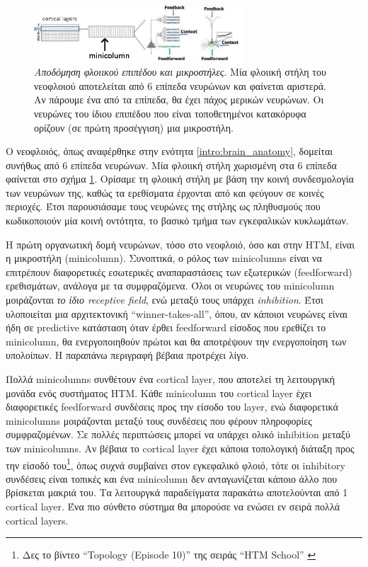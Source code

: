 \begin{figure}
	\centering
	\includegraphics[width=0.7\textwidth]{figures/layer-minicolumn}
	\caption{\textit{Αποδόμηση φλοιικού επιπέδου και μικροστήλες}. Μία φλοιική στήλη του νεοφλοιού αποτελείται από 6 επίπεδα νευρώνων και φαίνεται αριστερά. Αν πάρουμε ένα από τα επίπεδα, θα έχει πάχος μερικών νευρώνων. Οι νευρώνες του ίδιου επιπέδου που είναι τοποθετημένοι κατακόρυφα ορίζουν (σε πρώτη προσέγγιση) μια μικροστήλη.}
	\label{fig:layer-minicolumn}
\end{figure}

Ο νεοφλοιός, όπως αναφέρθηκε στην ενότητα \ref{intro:brain_anatomy}, δομείται συνήθως από 6 επίπεδα νευρώνων.
Μία φλοιική στήλη χωρισμένη στα 6 επίπεδα φαίνεται στο σχήμα \ref{fig:layer-minicolumn}.
Ορίσαμε τη φλοιική στήλη με βάση την κοινή συνδεσμολογία των νευρώνων της, καθώς τα ερεθίσματα έρχονται από και φεύγουν σε κοινές περιοχές.
Έτσι παρουσιάσαμε τους νευρώνες της στήλης ως πληθυσμούς που κωδικοποιούν μία κοινή οντότητα, το βασικό τμήμα των εγκεφαλικών κυκλωμάτων.

Η πρώτη οργανωτική δομή νευρώνων, τόσο στο νεοφλοιό, όσο και στην HTM, είναι η μικροστήλη (minicolumn).
Συνοπτικά, ο ρόλος των minicolumns είναι να επιτρέπουν διαφορετικές εσωτερικές αναπαραστάσεις των εξωτερικών (feedforward) ερεθισμάτων, ανάλογα με τα συμφραζόμενα.
Όλοι οι νευρώνες του minicolumn μοιράζονται \emph{το ίδιο receptive field}, ενώ μεταξύ τους υπάρχει \emph{inhibition}.
Έτσι υλοποιείται μια αρχιτεκτονική ``winner-takes-all'', όπου, αν κάποιοι νευρώνες είναι ήδη σε predictive κατάσταση όταν έρθει feedforward είσοδος που ερεθίζει το minicolumn, θα ενεργοποιηθούν πρώτοι και θα αποτρέψουν την ενεργοποίηση των υπολοίπων.
Η παραπάνω περιγραφή βέβαια προτρέχει λίγο.

Πολλά minicolumns συνθέτουν ένα cortical layer, που αποτελεί τη λειτουργική μονάδα ενός συστήματος HTM.
Κάθε minicolumn του cortical layer έχει διαφορετικές feedforward συνδέσεις προς την είσοδο του layer, ενώ διαφορετικά minicolumns μοιράζονται μεταξύ τους συνδέσεις που φέρουν πληροφορίες συμφραζομένων.
Σε πολλές περιπτώσεις μπορεί να υπάρχει ολικό inhibition μεταξύ των minicolumns.
Αν βέβαια το cortical layer έχει κάποια τοπολογική διάταξη προς την είσοδό του\footnote{Δες το βίντεο ``Topology (Episode 10)'' της σειράς ``HTM School'' \cite{htmschool}}, όπως συχνά συμβαίνει στον εγκεφαλικό φλοιό, τότε οι inhibitory συνδέσεις είναι τοπικές και ένα minicolumn δεν ανταγωνίζεται κάποιο άλλο που βρίσκεται μακριά του.
Τα λειτουργκά παραδείγματα παρακάτω αποτελούνται από 1 cortical layer.
Ένα πιο σύνθετο σύστημα θα μπορούσε να ενώσει εν σειρά πολλά cortical layers.

